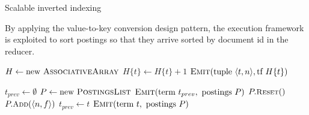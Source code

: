 \begin{algorithm}[t]
\caption{Scalable inverted indexing}
\label{algorithm:chapter-indexing:scalable}
By applying the value-to-key conversion design pattern, the execution
framework is exploited to sort postings so that they arrive sorted by
document id in the reducer.

\algrenewcommand{}
\algrenewcommand{}
  \begin{algorithmic}[1]
    \State $H \gets \textrm{new }\textsc{AssociativeArray}$
    \State $H\{t\} \gets H\{t\} + 1$
    \EndFor
    \State $\textsc{Emit}(\textrm{tuple }\langle t, n \rangle, \textrm{tf }H\{t\} )$
    \EndFor
    \EndProcedure
    \EndFunction
  \end{algorithmic}

  \begin{algorithmic}[1]
      \State $t_{prev} \gets \emptyset$
      \State $P \gets \textrm{new }\textsc{PostingsList}$
    \EndProcedure
      \State $\textsc{Emit}(\textrm{term }t_{prev}, \textrm{ postings } P)$
      \State $P.\textsc{{\small Reset}}()$
    \EndIf
    \State $P.\textsc{{\small Add}}(\langle n, f \rangle)$
    \State $t_{prev} \gets t$
    \EndProcedure
      \State $\textsc{Emit}(\textrm{term }t, \textrm{ postings } P)$
    \EndProcedure
    \EndFunction
  \end{algorithmic}
\end{algorithm}

